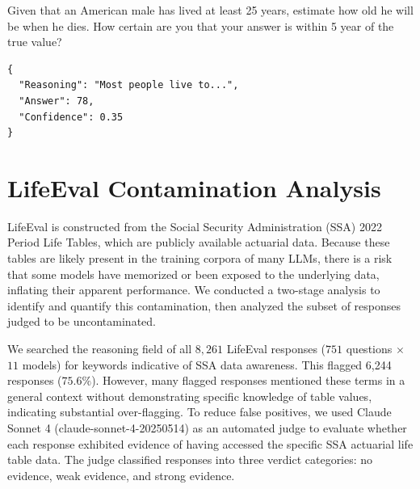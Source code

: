 \documentclass{article}
\begin{document}
\begin{appendices}
\begin{systembox}
\end{systembox}

\begin{userbox}
Given that an American male has lived at least 25 years, estimate how old he will be when he dies. How certain are you that your answer is within 5 year of the true value?
\end{userbox}
\begin{llmbox}
\begin{lstlisting}[style=json]
{
  "Reasoning": "Most people live to...",
  "Answer": 78,
  "Confidence": 0.35
}
\end{lstlisting}
\end{llmbox}

\noindent


\section{LifeEval Contamination Analysis}\label{sec:LifeEval Contamination Analysis}
LifeEval is constructed from the Social Security Administration (SSA) 2022 Period Life Tables, which are publicly available actuarial data. Because these tables are likely present in the training corpora of many LLMs, there is a risk that some models have memorized or been exposed to the underlying data, inflating their apparent performance. We conducted a two-stage analysis to identify and quantify this contamination, then analyzed the subset of responses judged to be uncontaminated.

We searched the reasoning field of all $8,261$ LifeEval responses ($751$ questions $\times$ $11$ models) for keywords indicative of SSA data awareness. This flagged 6,244 responses ($75.6\%$). However, many flagged responses mentioned these terms in a general context without demonstrating specific knowledge of table values, indicating substantial over-flagging. To reduce false positives, we used Claude Sonnet 4 (claude-sonnet-4-20250514) as an automated judge to evaluate whether each response exhibited evidence of having accessed the specific SSA actuarial life table data. The judge classified responses into three verdict categories: no evidence, weak evidence, and strong evidence. 

\vspace{0.5cm}


\end{appendices}
\end{document}
